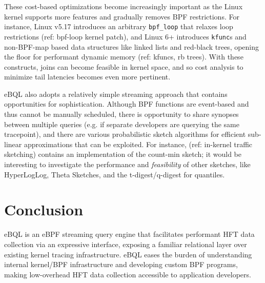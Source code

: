 \documentclass[11pt,a4paper]{article}
\begin{document}
These cost-based optimizations become increasingly important as the Linux kernel supports more
features and gradually removes BPF restrictions. For instance, Linux v5.17 introduces an arbitrary
\texttt{bpf\_loop} that relaxes loop restrictions (ref: bpf-loop kernel patch), and Linux 6+
introduces \texttt{kfunc}s and non-BPF-map based data structures like linked lists and red-black
trees, opening the floor for performant dynamic memory (ref: kfuncs, rb trees). With these
constructs, joins can become feasible in kernel space, and so cost analysis to minimize tail
latencies becomes even more pertinent.

eBQL also adopts a relatively simple streaming approach that contains opportunities for
sophistication. Although BPF functions are event-based and thus cannot be manually scheduled, there
is opportunity to share synopses between multiple queries (e.g. if separate developers are querying
the same tracepoint), and there are various probabilistic sketch algorithms for efficient sub-linear
approximations that can be exploited. For instance, (ref: in-kernel traffic sketching) contains an
implementation of the count-min sketch; it would be interesting to investigate the performance and
\textit{feasibility} of other sketches, like HyperLogLog, Theta Sketches, and the t-digest/q-digest
for quantiles.

\section{Conclusion}

eBQL is an eBPF streaming query engine that facilitates performant HFT data collection via an
expressive interface, exposing a familiar relational layer over existing kernel tracing
infrastructure. eBQL eases the burden of understanding internal kernel/BPF infrastructure and
developing custom BPF programs, making low-overhead HFT data collection accessible to application
developers.

\newpage



\newpage

\end{document}
